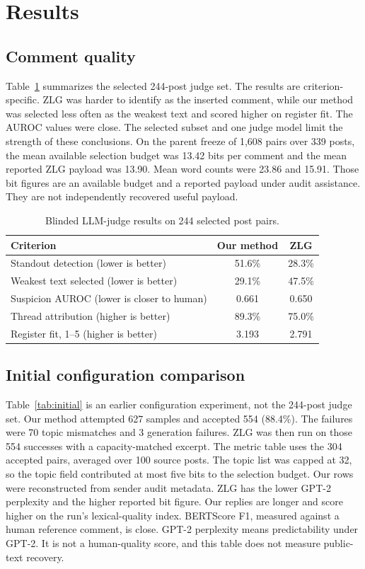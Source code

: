 \documentclass[3p,times,procedia]{elsarticle}
\begin{document}
\section{Results}

\subsection{Comment quality}

Table~\ref{tab:judge} summarizes the selected 244-post judge set. The results are criterion-specific. ZLG was harder to identify as the inserted comment, while our method was selected less often as the weakest text and scored higher on register fit. The AUROC values were close. The selected subset and one judge model limit the strength of these conclusions. On the parent freeze of 1,608 pairs over 339 posts, the mean available selection budget was 13.42 bits per comment and the mean reported ZLG payload was 13.90. Mean word counts were 23.86 and 15.91. Those bit figures are an available budget and a reported payload under audit assistance. They are not independently recovered useful payload.

\begin{table}[t]
\centering
\caption{Blinded LLM-judge results on 244 selected post pairs.}
\label{tab:judge}
\begin{tabular}{lcc}
\toprule
Criterion & Our method & ZLG \\
\midrule
Standout detection (lower is better) & 51.6\% & 28.3\% \\
Weakest text selected (lower is better) & 29.1\% & 47.5\% \\
Suspicion AUROC (lower is closer to human) & 0.661 & 0.650 \\
Thread attribution (higher is better) & 89.3\% & 75.0\% \\
Register fit, 1--5 (higher is better) & 3.193 & 2.791 \\
\bottomrule
\end{tabular}
\end{table}
\FloatBarrier

\subsection{Initial configuration comparison}

Table~\ref{tab:initial} is an earlier configuration experiment, not the 244-post judge set. Our method attempted 627 samples and accepted 554 (88.4\%). The failures were 70 topic mismatches and 3 generation failures. ZLG was then run on those 554 successes with a capacity-matched excerpt. The metric table uses the 304 accepted pairs, averaged over 100 source posts. The topic list was capped at 32, so the topic field contributed at most five bits to the selection budget. Our rows were reconstructed from sender audit metadata. ZLG has the lower GPT-2 perplexity and the higher reported bit figure. Our replies are longer and score higher on the run's lexical-quality index. BERTScore F1, measured against a human reference comment, is close. GPT-2 perplexity means predictability under GPT-2. It is not a human-quality score, and this table does not measure public-text recovery.
\end{document}
